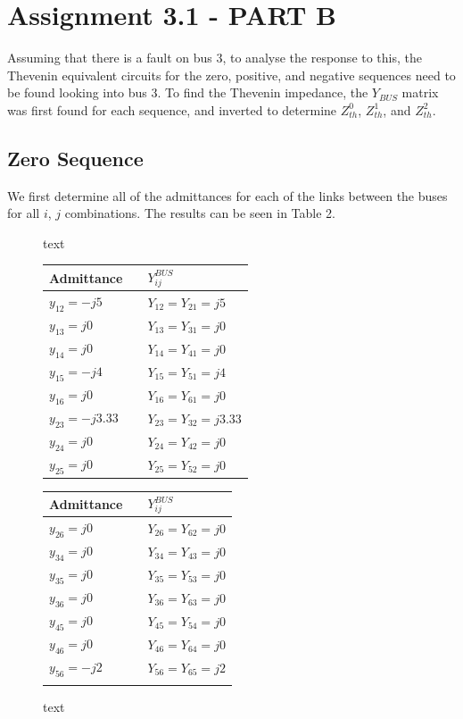 \documentclass{article}
\begin{document}
\section{Assignment 3.1 - PART B}
Assuming that there is a fault on bus 3, to analyse the response to this, the Thevenin equivalent circuits for the zero, positive, and negative sequences need to be found looking into bus 3. To find the Thevenin impedance, the $Y_{BUS}$ matrix was first found for each sequence, and inverted to determine $Z^0_{th}$, $Z^1_{th}$, and $Z^2_{th}$.

\subsection{Zero Sequence}
We first determine all of the admittances for each of the links between the buses for all $i$, $j$ combinations. The results can be seen in Table 2.
\begin{figure}[H]
	\begin{minipage}{0.5\linewidth}
		\centering
		\caption{text}
		\begin{tabular}{lcl}
			\toprule
			\textbf{Admittance}		&	&	$Y^{BUS}_{ij}$\\
			\midrule
			$y_{12} = -j5$			&	&	$Y_{12} = Y_{21} = j5$\\
			$y_{13} = j0$			&	&	$Y_{13} = Y_{31} = j0$\\
			$y_{14} = j0$			&	&	$Y_{14} = Y_{41} = j0$\\
			$y_{15} = -j4$			&	&	$Y_{15} = Y_{51} = j4$\\
			$y_{16} = j0$			&	&	$Y_{16} = Y_{61} = j0$\\
			$y_{23} = -j3.33$		&	&	$Y_{23} = Y_{32} = j3.33$\\
			$y_{24} = j0$			&	&	$Y_{24} = Y_{42} = j0$\\
			$y_{25} = j0$			&	&	$Y_{25} = Y_{52} = j0$\\
			\bottomrule
		\end{tabular}
	\end{minipage}
	\begin{minipage}{0.5\linewidth}
		\centering
		\caption{text}
		\begin{tabular}{lcl}
			\toprule
			\textbf{Admittance}		&	&	$Y^{BUS}_{ij}$\\
			\midrule
			$y_{26} = j0$			&	&	$Y_{26} = Y_{62} = j0$\\
			$y_{34} = j0$			&	&	$Y_{34} = Y_{43} = j0$\\
			$y_{35} = j0$			&	&	$Y_{35} = Y_{53} = j0$\\
			$y_{36} = j0$			&	&	$Y_{36} = Y_{63} = j0$\\
			$y_{45} = j0$			&	&	$Y_{45} = Y_{54} = j0$\\
			$y_{46} = j0$			&	&	$Y_{46} = Y_{64} = j0$\\
			$y_{56} = -j2$			&	&	$Y_{56} = Y_{65} = j2$\\
									&	&						\\
			\bottomrule
		\end{tabular}
	\end{minipage}
\end{figure}
\end{document}
